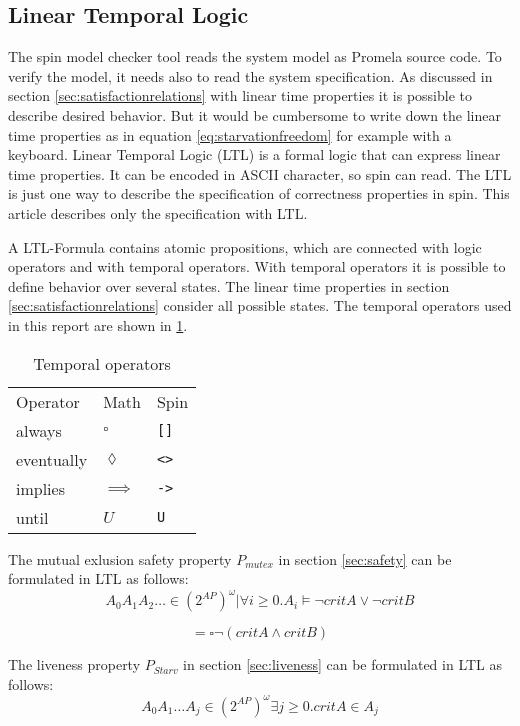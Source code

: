 \documentclass[12pt,a4paper,twoside]{article}
\begin{document}
\subsection{Linear Temporal Logic}
\label{sec:lineartemporallogic}

The spin model checker tool reads the system model as Promela source code. To verify the model, it needs also to read the system specification. As discussed in section \ref{sec:satisfactionrelations} with linear time properties it is possible to describe desired behavior. But it would be cumbersome to write down the linear time properties as in equation \ref{eq:starvationfreedom} for example with a keyboard. Linear Temporal Logic (LTL) is a formal logic that can express linear time properties. It can be encoded in ASCII character, so spin can read. The LTL is just one way to describe the specification of correctness properties in spin. This article describes only the specification with LTL.

A LTL-Formula contains atomic propositions, which are connected with logic operators and with temporal operators. With temporal operators it is possible to define behavior over several states. The linear time properties in section \ref{sec:satisfactionrelations} consider all possible states. The temporal operators used in this report are shown in \ref{tab:temporal_operators}.

\begin{table}
  \centering
  \begin{tabular}{l l l}
    Operator & Math & Spin \\
    always & $\square$ & \verb|[]| \\
    eventually & $\lozenge$ & \verb|<>| \\
    implies & $\implies$ & \verb|->| \\
    until & $U$ & \verb|U|
  \end{tabular}
  \caption{Temporal operators }
  \label{tab:temporal_operators}
\end{table}

The mutual exlusion safety property $P_{mutex}$ in section \ref{sec:safety} can be formulated in LTL as follows:
\[
  {A_0 A_1 A_2 \dots \in (2^{AP})^{\omega} | \forall i \geq 0. A_i \models \neg critA \lor \neg critB}
\]

\[
= \square \neg (critA \land critB)
\]

The liveness property $P_{Starv}$ in section \ref{sec:liveness} can be formulated in LTL as follows:
\[
 { A_0 A_1 \dots A_j \in (2^{AP})^{\omega} \exists j \geq 0. critA \in A_j}
\]
\end{document}
